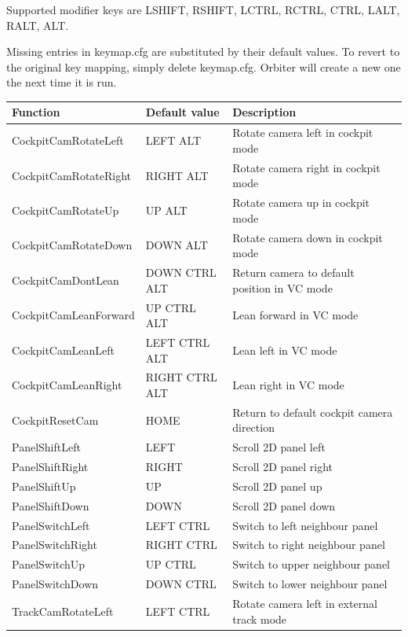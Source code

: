 \documentclass[Orbiter User Manual.tex]{subfiles}
\begin{document}
Supported modifier keys are LSHIFT, RSHIFT, LCTRL, RCTRL, CTRL, LALT, RALT, ALT.

Missing entries in keymap.cfg are substituted by their default values. To revert
to the original key mapping, simply delete keymap.cfg. Orbiter will create a new
one the next time it is run.

	\footnotesize
	\begin{longtable}{ p{} p{} p{} }
	\hline
	\textbf{Function} & \textbf{Default value} & \textbf{Description}\\
	\hline
	CockpitCamRotateLeft & LEFT ALT & Rotate camera left in cockpit mode\\
	\hline
	CockpitCamRotateRight & RIGHT ALT & Rotate camera right in cockpit mode\\
	\hline
	CockpitCamRotateUp & UP ALT & Rotate camera up in cockpit mode\\
	\hline
	CockpitCamRotateDown & DOWN ALT & Rotate camera down in cockpit mode\\
	\hline
	CockpitCamDontLean & DOWN CTRL ALT & Return camera to default position in VC
		mode\\
	\hline
	CockpitCamLeanForward & UP CTRL ALT & Lean forward in VC mode\\
	\hline
	CockpitCamLeanLeft & LEFT CTRL ALT & Lean left in VC mode\\
	\hline
	CockpitCamLeanRight & RIGHT CTRL ALT & Lean right in VC mode\\
	\hline
	CockpitResetCam & HOME & Return to default cockpit camera direction\\
	\hline
	PanelShiftLeft & LEFT & Scroll 2D panel left\\
	\hline
	PanelShiftRight & RIGHT & Scroll 2D panel right\\
	\hline
	PanelShiftUp & UP & Scroll 2D panel up\\
	\hline
	PanelShiftDown & DOWN & Scroll 2D panel down\\
	\hline
	PanelSwitchLeft & LEFT CTRL & Switch to left neighbour panel\\
	\hline
	PanelSwitchRight & RIGHT CTRL & Switch to right neighbour panel\\
	\hline
	PanelSwitchUp & UP CTRL & Switch to upper neighbour panel\\
	\hline
	PanelSwitchDown & DOWN CTRL & Switch to lower neighbour panel\\
	\hline
	TrackCamRotateLeft & LEFT CTRL & Rotate camera left in external track mode\\

\end{longtable}
\end{document}

